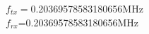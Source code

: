 \documentclass[preview]{standalone}
\begin{document}
\begin{center}
$f_{tx}=$0.20369578583180656MHz\\$f_{rx}$=0.20369578583180656MHz
\end{center}
\end{document}

